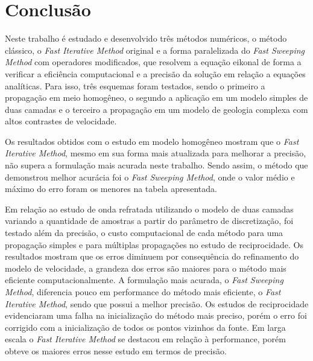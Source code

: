 \chapter{Conclusão}
\label{ch:conclusao}

Neste trabalho é estudado e desenvolvido três métodos numéricos, o método clássico, o \textit{Fast Iterative Method} original e a forma paralelizada do \textit{Fast Sweeping Method} com operadores modificados, que resolvem a equação eikonal de forma a verificar a eficiência computacional e a precisão da solução em relação a equações analíticas. Para isso, três esquemas foram testados, sendo o primeiro a propagação em meio homogêneo, o segundo a aplicação em um modelo simples de duas camadas e o terceiro a propagação em um modelo de geologia complexa com altos contrastes de velocidade. 

Os resultados obtidos com o estudo em modelo homogêneo mostram que o \textit{Fast Iterative Method}, mesmo em sua forma mais atualizada para melhorar a precisão, não supera a formulação mais acurada neste trabalho. Sendo assim, o método que demonstrou melhor acurácia foi o \textit{Fast Sweeping Method}, onde o valor médio e máximo do erro foram os menores na tabela apresentada. 

Em relação ao estudo de onda refratada utilizando o modelo de duas camadas variando a quantidade de amostras a partir do parâmetro de discretização, foi testado além da precisão, o custo computacional de cada método para uma propagação simples e para múltiplas propagações no estudo de reciprocidade. Os resultados mostram que os erros diminuem por consequência do refinamento do modelo de velocidade, a grandeza dos erros são maiores para o método mais eficiente computacionalmente. A formulação mais acurada, o \textit{Fast Sweeping Method}, diferencia pouco em performance do método mais eficiente, o \textit{Fast Iterative Method}, sendo que possui a melhor precisão. Os estudos de reciprocidade evidenciaram uma falha na inicialização do método mais preciso, porém o erro foi corrigido com a inicialização de todos os pontos vizinhos da fonte. Em larga escala o \textit{Fast Iterative Method} se destacou em relação à performance, porém obteve os maiores erros nesse estudo em termos de precisão.     

